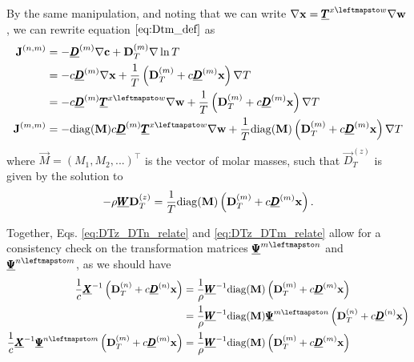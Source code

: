 By the same manipulation, and noting that we can write $\nabla \vec{x} = \Mat{T}^{x \leftmapsto w} \nabla \Vec{w}$, we can rewrite equation $\eqref{eq:Dtm_def}$ as 
\begin{equation}
    \begin{split}
        \Vec{J}^{(n, m)} &= - \Mat{D}^{(m)} \nabla \Vec{c} + \Vec{D}_T^{(m)} \nabla \ln T \\
        &= - c \Mat{D}^{(m)} \nabla \Vec{x} + \frac{1}{T} \left( \Vec{D}_T^{(m)} + c \Mat{D}^{(m)}\Vec{x}\right) \nabla T \\
        &= - c \Mat{D}^{(m)} \Mat{T}^{x \leftmapsto w} \nabla \Vec{w} + \frac{1}{T} \left( \Vec{D}_T^{(m)} + c \Mat{D}^{(m)}\Vec{x}\right) \nabla T \\
        \Vec{J}^{(m, m)} &= - \diag(\Vec{M}) c \Mat{D}^{(m)} \Mat{T}^{x \leftmapsto w} \nabla \Vec{w} + \frac{1}{T} \diag(\Vec{M}) \left( \Vec{D}_T^{(m)} + c \Mat{D}^{(m)}\Vec{x}\right) \nabla T
    \end{split}
\end{equation}
where $\Vec{M} = (M_1, M_2, ...)^{\top}$ is the vector of molar masses, such that $\Vec{D}_T^{(z)}$ is given by the solution to
\begin{equation}
    - \rho \underline{\pmb{W}} \boldsymbol{\mathrm{D}}_T^{(z)} = \frac{1}{T} \mathrm{diag}(\boldsymbol{\mathrm{M}}) \left( \boldsymbol{\mathrm{D}}_T^{(m)} + c \underline{\pmb{D}}^{(m)}\boldsymbol{\mathrm{x}}\right).
    \label{eq:DTz_DTm_relate}
\end{equation}

Together, Eqs. \eqref{eq:DTz_DTn_relate} and \eqref{eq:DTz_DTm_relate} allow for a consistency check on the transformation matrices $\Mat{\Psi}^{m \leftmapsto n}$ and $\Mat{\Psi}^{n \leftmapsto m}$, as we should have
\begin{equation}
    \begin{split}
        \frac{1}{c} \Mat{X}^{-1}\left( \Vec{D}_T^{(n)} + c \Mat{D}^{(n)}\Vec{x}\right) &= \frac{1}{\rho} \Mat{W}^{-1} \diag(\Vec{M}) \left( \Vec{D}_T^{(m)} + c \Mat{D}^{(m)}\Vec{x}\right) \\
        &= \frac{1}{\rho} \Mat{W}^{-1} \diag(\Vec{M}) \Mat{\Psi}^{m \leftmapsto n} \left( \Vec{D}_T^{(n)} + c \Mat{D}^{(n)}\Vec{x}\right) \\
        \frac{1}{c} \Mat{X}^{-1} \Mat{\Psi}^{n \leftmapsto m} \left( \Vec{D}_T^{(m)} + c \Mat{D}^{(m)}\Vec{x}\right) &= \frac{1}{\rho} \Mat{W}^{-1} \diag(\Vec{M}) \left( \Vec{D}_T^{(m)} + c \Mat{D}^{(m)}\Vec{x}\right)
    \end{split}
\end{equation}


